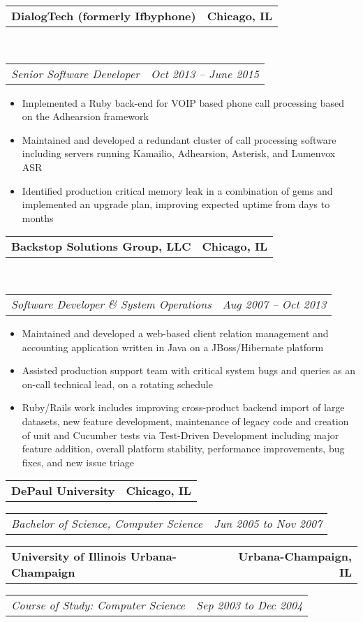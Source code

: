 \documentclass[10pt,letterpaper]{article}
\makeatletter
\newcommand{\headerrow}[2]
{\begin{tabular*}{\linewidth}{l@{\extracolsep{\fill}}r}
  #1 &
  #2 \\
\end{tabular*}}
\newenvironment{indentsection}[1]%
{\begin{list}{}%
  {\setlength{\leftmargin}{#1}}%
  \item[]%
}
{\end{list}}
\makeatother
\begin{document}
\begin{indentsection}{\parindent}
  \headerrow
    {\textbf{DialogTech (formerly Ifbyphone)} }
    {\textbf{Chicago, IL}}
  \\
  \headerrow
    {\emph{Senior Software Developer}}
    {\emph{Oct 2013 -- June 2015}}

  \begin{itemize}
  \renewcommand{\labelitemi}{$-$}
  \vspace{-0.1in}
    \item Implemented a Ruby back-end for VOIP based phone call processing based on the Adhearsion framework
    \item Maintained and developed a redundant cluster of call processing software including servers running Kamailio, Adhearsion, Asterisk, and Lumenvox ASR
    \item Identified production critical memory leak in a combination of gems and implemented an upgrade plan, improving expected uptime from days to months
  \end{itemize}
\end{indentsection}
\begin{indentsection}{\parindent}
  \headerrow
    {\textbf{Backstop Solutions Group, LLC} }
    {\textbf{Chicago, IL}}
  \\
  \headerrow
    {\emph{Software Developer \& System Operations}}
    {\emph{Aug 2007 -- Oct 2013}}

  \begin{itemize}
  \renewcommand{\labelitemi}{$-$}
  \vspace{-0.1in}
    \item Maintained and developed a web-based client relation management and accounting application written in Java on a JBoss/Hibernate platform
    \item Assisted production support team with critical system bugs and queries as an on-call technical lead, on a rotating schedule
    \item Ruby/Rails work includes improving cross-product backend import of large datasets, new feature development, maintenance of legacy code and creation of unit and Cucumber tests via Test-Driven Development including major feature addition, overall platform stability, performance improvements, bug fixes, and new issue triage
  \end{itemize}
\end{indentsection}
\begin{indentsection}{\parindent}
  \headerrow
    {\textbf{DePaul University}}
    {\textbf{Chicago, IL}}
  \vspace{0.1in}
  \headerrow
    {\emph{Bachelor of Science, Computer Science}}
    {\emph{Jun 2005 to Nov 2007}}
  \headerrow
    {\textbf{University of Illinois Urbana-Champaign}}
    {\textbf{Urbana-Champaign, IL}}
  \headerrow
    {\emph{Course of Study: Computer Science}}
    {\emph{Sep 2003 to Dec 2004}}

\end{indentsection}
\end{document}
